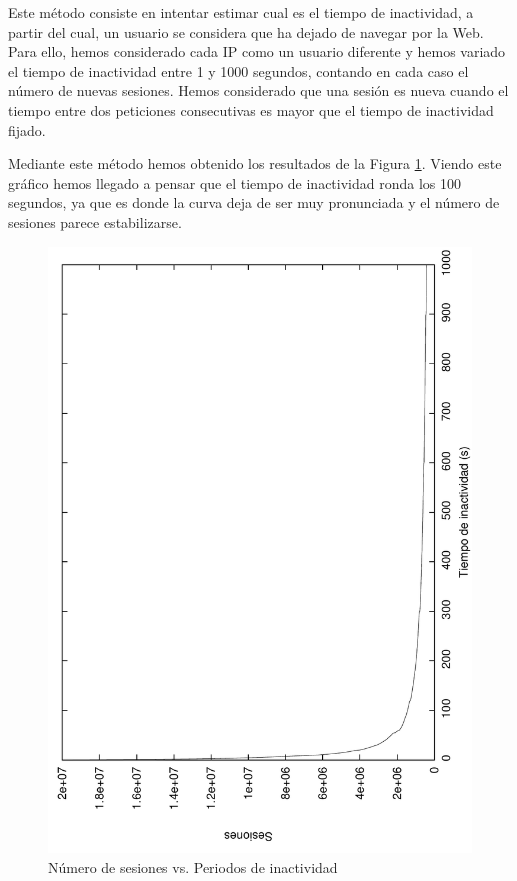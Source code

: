 \documentclass[twocolumn]{Jornadas}
\begin{document}
Este método consiste en intentar estimar cual es el tiempo de inactividad, a partir del cual, un usuario se considera que ha dejado de navegar por la Web. Para ello, hemos considerado cada IP como un usuario diferente y hemos variado el tiempo de inactividad entre 1 y 1000 segundos, contando en cada caso el número de nuevas sesiones. Hemos considerado que una sesión es nueva cuando el tiempo entre dos peticiones consecutivas es mayor que el tiempo de inactividad fijado.

Mediante este método hemos obtenido los resultados de la Figura \ref{fig:numberSessions}. Viendo este gráfico hemos llegado a pensar que el tiempo de inactividad ronda los 100 segundos, ya que es donde la curva deja de ser muy pronunciada y el número de sesiones parece estabilizarse.

\begin{figure}[]
\begin{center}
  \includegraphics[scale=0.30,angle=-90]{figures/inactivityPeriod_full.pdf}
\end{center}
\caption{Número de sesiones vs. Periodos de inactividad} \label{fig:numberSessions}
\end{figure}
\end{document}
